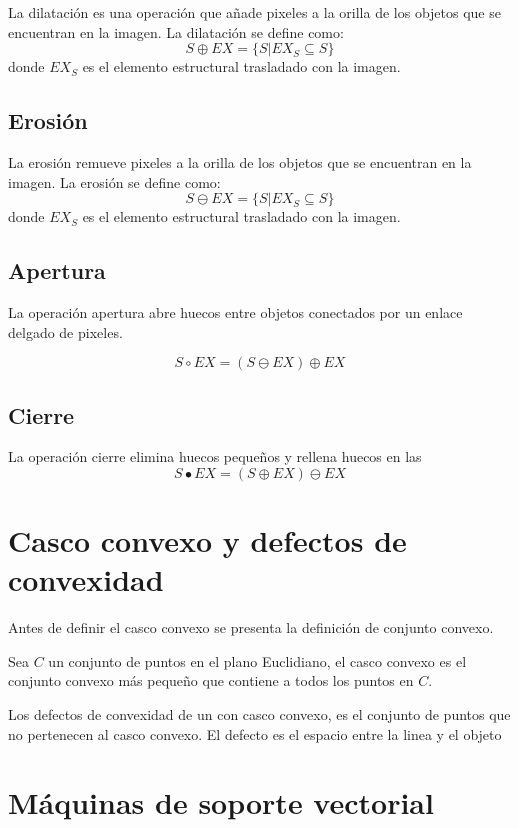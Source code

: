 La dilatación es una operación que añade pixeles a la orilla de los objetos que se encuentran en la imagen. La dilatación se define como:  
$$S \oplus EX = \lbrace S|EX_S \subseteq S \rbrace$$  
donde $EX_S$ es el elemento estructural trasladado con la imagen. 

\subsection{Erosión}\label{OMerosion}

La erosión remueve pixeles a la orilla de los objetos que se encuentran en la imagen. La erosión se define como: 
$$S \ominus EX = \lbrace S|EX_S \subseteq S \rbrace$$ 
donde $EX_S$ es el elemento estructural trasladado con la imagen. 

\subsection{Apertura}\label{Opening} 

La operación apertura abre huecos entre objetos conectados por un enlace delgado de pixeles.  

$$S \circ EX = (S \ominus EX) \oplus EX $$

\subsection{Cierre}\label{Cierre}

La operación cierre elimina huecos pequeños  y rellena huecos en las
$$S \bullet EX = (S \oplus EX) \ominus EX $$

\section{Casco convexo y defectos de convexidad}\label{sec:Convexhull} 

Antes de definir el casco convexo se presenta la definición de conjunto convexo. 
 

Sea $C$ un conjunto de puntos en el plano Euclidiano, el casco convexo es el conjunto convexo más pequeño que contiene a todos los puntos en $C$. 

Los defectos de convexidad de un con casco convexo, es el conjunto de puntos que no pertenecen al casco convexo. El defecto es el espacio entre la linea y el objeto  



\section{M\'aquinas de soporte vectorial}\label{sec:SVM} 

